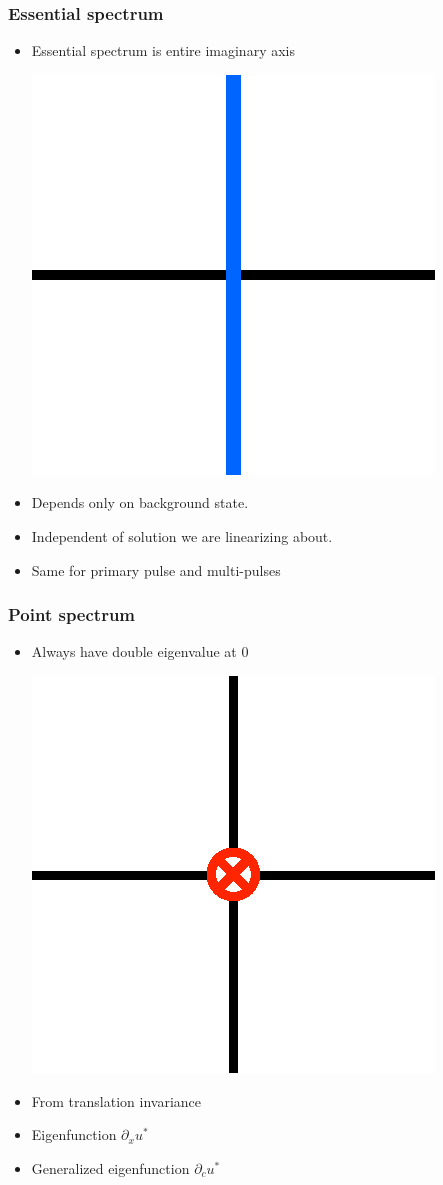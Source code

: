 \documentclass[16pt]{beamer}
\begin{document}
\begin{frame}
	\frametitle{Essential spectrum}
	\fontsize{16}{7.2}\selectfont
	\begin{itemize}
		\item Essential spectrum is entire imaginary axis
			\begin{center}
			\includegraphics[width=0.3\linewidth]{images/essspec1.eps}
			\end{center}

		\item Depends only on background state.
		\vspace{0.25cm}
		\item Independent of solution we are linearizing about.
		\vspace{0.25cm}
		\item Same for primary pulse and multi-pulses
	\end{itemize}
\end{frame}

\begin{frame}
	\frametitle{Point spectrum}
	\fontsize{16}{7.2}\selectfont
	\begin{itemize}
		\item Always have double eigenvalue at 0
		\begin{center}
			\includegraphics[width=0.3\linewidth]{images/eigsingle.eps}
		\end{center}
		\item From translation invariance
		\vspace{0.25cm}
		\item Eigenfunction $\partial_x u^*$
		\vspace{0.25cm}
		\item Generalized eigenfunction $\partial_c u^*$
	\end{itemize}
\end{frame}
\end{document}

